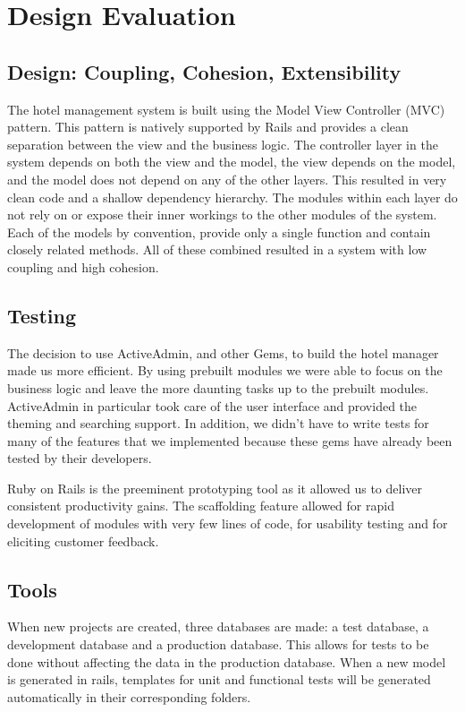 \documentclass[12pt]{elsarticle}
\begin{document}
\section{Design Evaluation}

\subsection{Design: Coupling, Cohesion, Extensibility}

The hotel management system is built using the Model View Controller (MVC) pattern. This pattern is natively supported by Rails and provides a clean separation between the view and the business logic. The controller layer in the system depends on both the view and the model, the view depends on the model, and the model does not depend on any of the other layers. This resulted in very clean code and a shallow dependency hierarchy. The modules within each layer do not rely on or expose their inner workings to the other modules of the system. Each of the models by convention, provide only a single function and contain closely related methods. All of these combined resulted in a system with low coupling and high cohesion.

\subsection{Testing}

The decision to use ActiveAdmin, and other Gems, to build the hotel manager made us more efficient. By using prebuilt modules we were able to focus on the business logic and leave the more daunting tasks up to the prebuilt modules. ActiveAdmin in particular took care of the user interface and provided the theming and searching support. In addition, we didn't have to write tests for many of the features that we implemented because these gems have already been tested by their developers.

Ruby on Rails is the preeminent prototyping tool as it allowed us to deliver consistent productivity gains. The scaffolding feature allowed for rapid development of modules with very few lines of code, for usability testing and for eliciting customer feedback.

\subsection{Tools}

When new projects are created, three databases are made: a test database, a development database and a production database. This allows for tests to be done without affecting the data in the production database. When a new model is generated in rails, templates for unit and functional tests will be generated automatically in their corresponding folders. 
\end{document}
